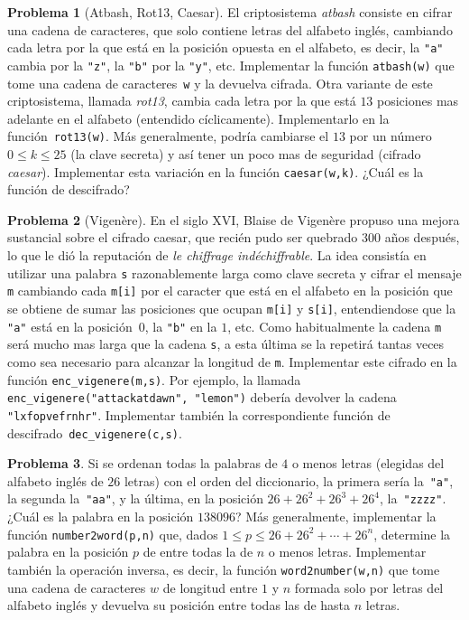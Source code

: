 \documentclass[a4paper, 11pt]{article}
\newcounter{numerodetema}
\theoremstyle{plain}
\theoremstyle{definition}
\newtheorem{prob}{Problema}[numerodetema]
\begin{document}
\begin{prob}[Atbash, Rot13, Caesar]
El criptosistema \emph{atbash} consiste en cifrar una cadena de caracteres, que solo
contiene letras del alfabeto inglés, cambiando cada letra por la que está en
la posición opuesta en el alfabeto, es decir, la \texttt{"a"} cambia por la
\texttt{"z"}, la \texttt{"b"} por la \texttt{"y"}, etc. Implementar la función
\texttt{atbash(w)} que tome una cadena de caracteres~\texttt{w} y la devuelva
cifrada. Otra variante de este criptosistema, llamada \emph{rot13}, cambia cada letra
por la que está $13$ posiciones mas adelante en el alfabeto (entendido cíclicamente).
Implementarlo en la función~\texttt{rot13(w)}. Más generalmente, podría
cambiarse el $13$ por un número $0\leq k\leq 25$ (la clave secreta) y así
tener un poco mas de seguridad (cifrado \emph{caesar}). Implementar esta variación
en la función \texttt{caesar(w,k)}. ¿Cuál es la función de descifrado?
\end{prob}

\begin{prob}[Vigenère]
En el siglo XVI, Blaise de Vigenère propuso una mejora sustancial sobre el
cifrado caesar, que recién pudo ser quebrado $300$ años después, lo que le
dió la reputación de \emph{le chiffrage indéchiffrable}. La idea consistía
en utilizar una palabra \texttt{s} razonablemente larga como clave secreta y
cifrar el mensaje \texttt{m} cambiando cada \texttt{m[i]} por el caracter que está
en el alfabeto en la posición que se obtiene de sumar las posiciones que ocupan
\texttt{m[i]} y \texttt{s[i]}, entendiendose que la \texttt{"a"} está en la
posición~$0$, la \texttt{"b"} en la $1$, etc. Como habitualmente la cadena
\texttt{m} será mucho mas larga que la cadena \texttt{s}, a esta última se la
repetirá tantas veces como sea necesario para alcanzar la longitud de \texttt{m}.
Implementar este cifrado en la función \texttt{enc\_vigenere(m,s)}. Por ejemplo,
la llamada \texttt{enc\_vigenere("attackatdawn", "lemon")} debería devolver la
cadena \texttt{"lxfopvefrnhr"}. Implementar también la correspondiente función
de descifrado~\texttt{dec\_vigenere(c,s)}.
\end{prob}

\begin{prob}
Si se ordenan todas la palabras de $4$ o menos letras (elegidas del alfabeto
inglés de $26$ letras) con el orden del diccionario, la primera sería
la~\texttt{"a"}, la segunda la~\texttt{"aa"}, y la última, en la posición
$26+26^2+26^3+26^4$, la~\texttt{"zzzz"}. ¿Cuál es la palabra en la posición
$138096$? Más generalmente, implementar la función \texttt{number2word(p,n)}
que, dados $1\leq p\leq 26+26^2+\cdots+26^n$, determine la palabra en la
posición $p$ de entre todas la de $n$ o menos letras. Implementar también la
operación inversa, es decir, la función \texttt{word2number(w,n)} que tome
una cadena de caracteres $w$ de longitud entre $1$ y $n$ formada solo por
letras del alfabeto inglés y devuelva su posición entre todas las de
hasta $n$ letras.
\end{prob}
\end{document}
